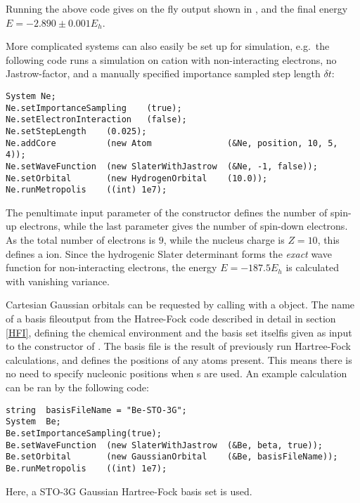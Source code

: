 \documentclass[../../master.tex]{subfiles}
\begin{document}
Running the above code gives on the fly output shown in , and the final energy $E=-2.890\pm0.001E_h$.

More complicated systems can also easily be set up for simulation, e.g.\ the following code runs a simulation on  cation with non-interacting electrons, no Jastrow-factor, and a manually specified importance sampled step length $\delta t$:
\begin{lstlisting}[language={[std]c++}]
System Ne;
Ne.setImportanceSampling    (true);
Ne.setElectronInteraction   (false);
Ne.setStepLength    (0.025);
Ne.addCore          (new Atom               (&Ne, position, 10, 5, 4));
Ne.setWaveFunction  (new SlaterWithJastrow  (&Ne, -1, false));
Ne.setOrbital       (new HydrogenOrbital    (10.0));
Ne.runMetropolis    ((int) 1e7);
\end{lstlisting}
The penultimate input parameter of the  constructor defines the number of spin-up electrons, while the last parameter gives the number of spin-down electrons. As the total number of electrons is $9$, while the nucleus charge is $Z=10$, this defines a  ion. Since the hydrogenic Slater determinant forms the \emph{exact} wave function for non-interacting electrons, the energy $E=-187.5E_h$ is calculated with vanishing variance. 

Cartesian Gaussian orbitals can be requested by calling  with a  object. The name of a basis file\textemdash output from the Hatree-Fock code described in detail in section \ref{HFI}, defining the chemical environment and the basis set itself\textemdash is given as input to the constructor of . The basis file is the result of previously run Hartree-Fock calculations, and defines the positions of any atoms present. This means there is no need to specify nucleonic positions when s are used. An example calculation can be ran by the following  code:
\begin{lstlisting}[language={[std]c++}]
string  basisFileName = "Be-STO-3G";
System  Be;
Be.setImportanceSampling(true);
Be.setWaveFunction  (new SlaterWithJastrow  (&Be, beta, true));
Be.setOrbital       (new GaussianOrbital    (&Be, basisFileName));
Be.runMetropolis    ((int) 1e7);
\end{lstlisting}
Here, a STO-3G Gaussian Hartree-Fock basis set is used. 

\renewcommand{\r}{{\bf r}}
\newcommand{\x}{{\bf x}}
\renewcommand{\R}{{\bf R}}
\newcommand{\Psit}{\Psi_\text{T}}
\newcommand{\pphi}{\tilde{\phi}}
\end{document}

